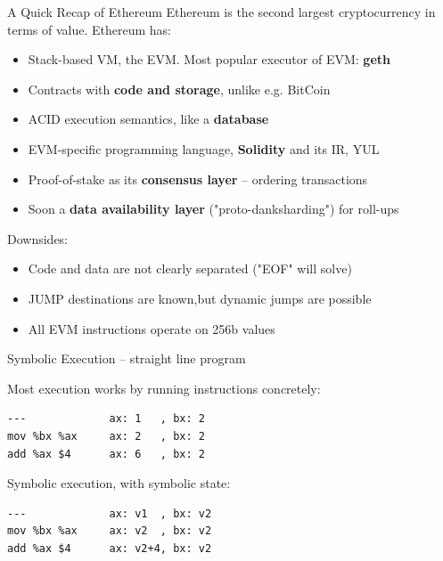 \documentclass[aspectratio=169]{beamer}
\begin{document}
\begin{frame}{A Quick Recap of Ethereum}
Ethereum is the second largest cryptocurrency in terms of value. Ethereum has:
\begin{itemize}
\item Stack-based VM, the EVM. Most popular executor of EVM: \textbf{geth}
\item Contracts with \textbf{code and storage}, unlike e.g. BitCoin
\item ACID execution semantics, like a \textbf{database}
\item EVM-specific programming language, \textbf{Solidity} and its IR, YUL
\item Proof-of-stake as its \textbf{consensus layer} -- ordering transactions
\item Soon a \textbf{data availability layer} ("proto-danksharding") for roll-ups
\end{itemize}

Downsides:
\begin{itemize}
\item Code and data are not clearly separated ("EOF" will solve)
\item JUMP destinations are known,but dynamic jumps are possible
\item All EVM instructions operate on 256b values
\end{itemize}

\end{frame}


\begin{frame}[fragile=singleslide]{Symbolic Execution -- straight line program}

Most execution works by running instructions concretely:
\begin{verbatim}
---             ax: 1   , bx: 2
mov %bx %ax     ax: 2   , bx: 2
add %ax $4      ax: 6   , bx: 2
\end{verbatim}
\bigskip

Symbolic execution, with symbolic state:
\begin{verbatim}
---             ax: v1  , bx: v2
mov %bx %ax     ax: v2  , bx: v2
add %ax $4      ax: v2+4, bx: v2
\end{verbatim}
\end{frame}
\end{document}
